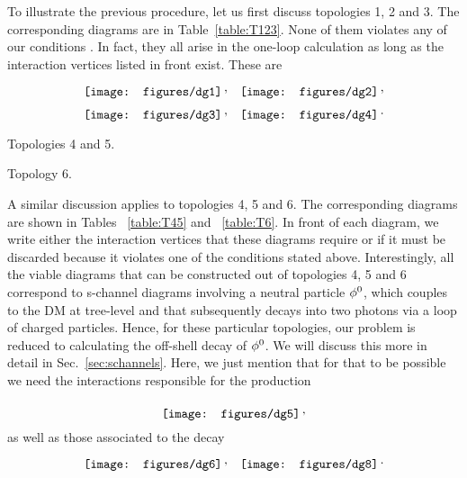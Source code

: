 To illustrate the previous procedure, let us first discuss  topologies 1, 2 and 3. The corresponding diagrams are in Table~\ref{table:T123}.   
 None of them violates any of our conditions \cond. In fact, they all arise in the one-loop calculation as long as the interaction vertices listed in front exist. These are
%
\begin{align}&
\raisebox{-.5\height}{\texttt{[image: figures/dg1]}}\,, &
\raisebox{-.5\height}{\texttt{[image: figures/dg2]}}\,, \nonumber\\&
\raisebox{-.5\height}{\texttt{[image: figures/dg3]}}\,,&
\raisebox{-.5\height}{\texttt{[image: figures/dg4]}}\,.
\label{eq:T123}
\end{align}


\begin{table}[H]
\centering
\usebox{\Tb}
\caption{Topologies 4 and 5.}
\label{table:T45}
\end{table}
\begin{table}[h]
\centering
\usebox{\Tc}
\caption{Topology 6.}
\label{table:T6}
\end{table}

A similar discussion applies to topologies 4, 5 and 6. The corresponding diagrams are shown in Tables ~\ref{table:T45} and ~\ref{table:T6}. In front of each diagram,  we write either the interaction vertices that these diagrams require or if it must be discarded because it violates one of the conditions stated above.  Interestingly, all the viable diagrams that can be constructed out of topologies 4, 5 and 6 correspond to s-channel diagrams involving a neutral particle ${\phi^0}$, which couples to the DM at tree-level and that subsequently decays into two photons via a loop of charged particles. Hence,  for these particular topologies, our problem is reduced to calculating the off-shell decay of ${\phi^0}$.  We will discuss this more in detail in Sec.~\ref{sec:schannels}. Here, we just mention that for that to be possible  we need the interactions responsible for the production 
 
\begin{align}
\raisebox{-.5\height}{\texttt{[image: figures/dg5]}}\,,
\label{eq:lscprod}
\end{align}
as well as those associated to the decay
\begin{align}&
\raisebox{-.5\height}{\texttt{[image: figures/dg6]}} \,,&\raisebox{-.5\height}{\texttt{[image: figures/dg8]}}\,.
\label{eq:lscdecay}
\end{align}


